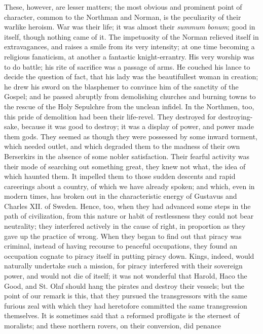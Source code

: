 These, however, are lesser
matters; the most obvious and prominent point of character, common to
the Northman and Norman, is the peculiarity of their warlike heroism.
War was their life; it was almost their \emph{summum bonum}; good in
itself, though nothing came of it. The impetuosity of the Norman
relieved itself in extravagances, and raises a smile from its very
intensity; at one time becoming a religious fanaticism, at another a
fantastic knight-errantry. His very worship was to do battle; his rite
of sacrifice was a passage of arms. He couched his lance to decide the
question of fact, that his lady was the beautifullest woman in
creation; he drew his sword on the blasphemer to convince him of the
sanctity of the Gospel; and he passed abruptly from demolishing
churches and burning towns to the rescue of the Holy Sepulchre from
the unclean infidel. In the Northmen, too, this pride of demolition
had been their life-revel. They destroyed for destroying-sake,
because it was good to destroy; it was a display of power, and power
made them gods. They seemed as though they were possessed by some
inward torment, which needed outlet, and which degraded them to the
madness of their own Berserkirs in the absence of some nobler
satisfaction. Their fearful activity was their mode of searching out
something great, they knew not what, the idea of which haunted them.
It impelled them to those sudden descents and rapid careerings about a
country, of which we have already spoken; and which, even in modern
times, has broken out in the characteristic energy of Gustavus and
Charles XII. of Sweden. Hence, too, when they had advanced some steps
in the path of civilization, from this nature or habit of restlessness
they could not bear neutrality; they interfered actively in the cause
of right, in proportion as they gave up the practice of wrong. When
they began to find out that piracy was criminal, instead of having
recourse to peaceful occupations, they found an occupation cognate to
piracy itself in putting piracy down. Kings, indeed, would naturally
undertake such a mission, for piracy interfered with their sovereign
power, and would not die of itself; it was not wonderful that Harold,
Haco the Good, and St. Olaf should hang the pirates and destroy their
vessels; but the point of our remark is this, that they pursued the
transgressors with the same furious zeal with which they had
heretofore committed the same transgression themselves. It is
sometimes said that a reformed profligate is the sternest of
moralists; and these northern rovers, on their conversion, did penance
